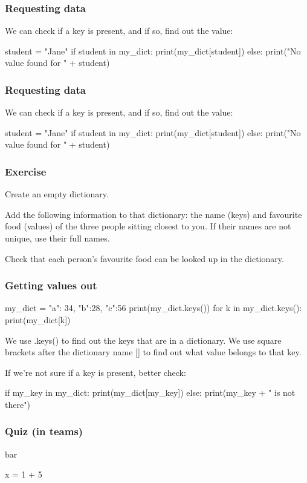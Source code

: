 \documentclass{beamer}
\begin{document}
\begin{frame}[fragile]
\frametitle{Requesting data}
We can check if a key is present, and if so, find out the
value:
\begin{code}
student = "Jane"
if student in my_dict:
   print(my_dict[student])
else:
   print("No value found for " + student)
\end{code}
\end{frame}

\begin{frame}[fragile]
\frametitle{Requesting data}
We can check if a key is present, and if so, find out the
value:
\begin{code}
student = "Jane"
if student in my_dict:
   print(my_dict[student])
else:
   print("No value found for " + student)
\end{code}
\end{frame}

\begin{frame}
\frametitle{Exercise}
Create an empty dictionary.

Add the following information to that dictionary: the
name (keys) and favourite food (values) of the three
people sitting closest to you. If their names are not
unique, use their full names.

Check that each person's favourite food can be looked
up in the dictionary.
\end{frame}

\begin{frame}[fragile]
\frametitle{Getting values out}
\begin{code}
my_dict = { "a": 34, "b":28, "c":56 }
print(my_dict.keys())
for k in my_dict.keys():
   print(my_dict[k])
\end{code}
 We use .keys() to find out the keys that are in a dictionary.
We use square brackets after the dictionary name [] to find
out what value belongs to that key.

\bigskip

If we're not sure if a key is present, better check:
\begin{code}
if my_key in my_dict:
   print(my_dict[my_key])
else:
   print(my_key + " is not there")
\end{code}
\end{frame}

\begin{frame}[fragile]
\frametitle{Quiz (in teams)}
bar
\begin{code}
x = 1 + 5
\end{code}
\end{frame}
\end{document}
